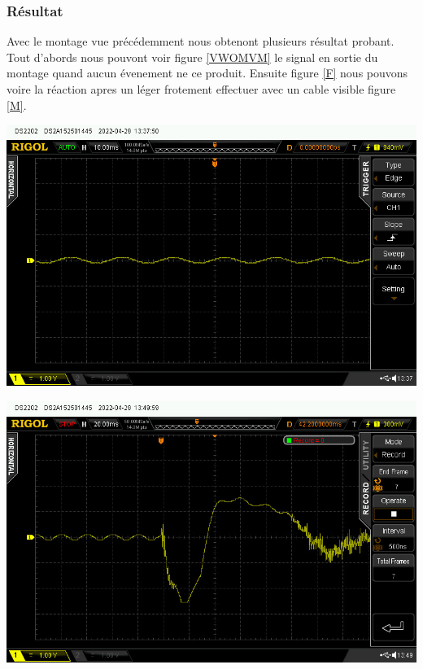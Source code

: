 \documentclass[11pt,french,a4paper]{article}
\begin{document}
\subsubsection{Résultat}
Avec le montage vue précédemment nous obtenont plusieurs résultat probant.
Tout d'abords nous pouvont voir figure \ref{VWOMVM} le signal en sortie du montage quand aucun évenement ne ce produit.
Ensuite figure \ref{F} nous pouvons voire la réaction apres un léger frotement effectuer avec un cable visible figure \ref{M}. 

\begin{center}	
\includegraphics[scale=0.5]{../img/plat.jpg}
\label{VWOMVM}
\end{center}

\begin{center}	
\includegraphics[scale=0.5]{../img/frotment.jpg}
\label{F}
\end{center}
\end{document}
